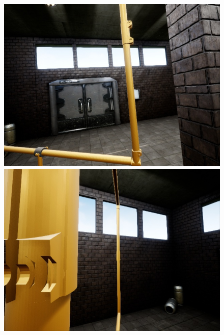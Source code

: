 \documentclass{article}
\begin{document}
\begin{figure}[htbp]
	\begin{minipage}{0.3\linewidth}
	\includegraphics[width=\linewidth]{size_examples/05-10 (1).jpg}
\end{minipage}
\hfill
\begin{minipage}{0.3\linewidth}
	\includegraphics[width=\linewidth]{size_examples/05-10 (10).jpg}
\end{minipage}
\hfill
\begin{minipage}{0.3\linewidth}

\end{minipage}
\end{figure}
\end{document}
